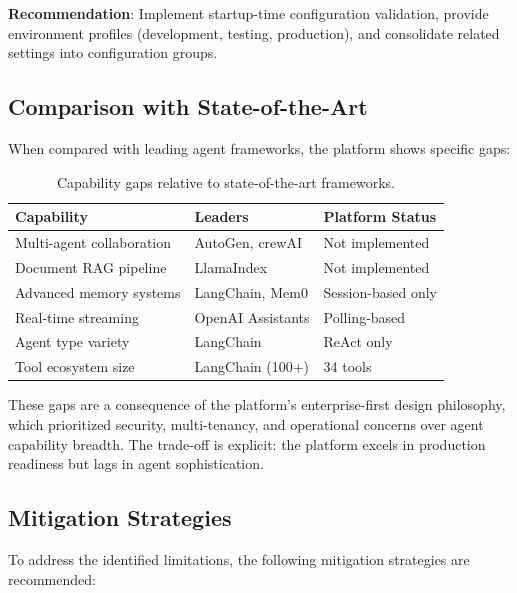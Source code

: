 \textbf{Recommendation}: Implement startup-time configuration validation, provide environment profiles (development, testing, production), and consolidate related settings into configuration groups.

\subsection{Comparison with State-of-the-Art}

When compared with leading agent frameworks, the platform shows specific gaps:

\begin{table}[ht]
\centering
\caption{Capability gaps relative to state-of-the-art frameworks.}
\label{tab:sota-gaps}
\small
\begin{tabular}{p{4cm}p{3cm}p{5cm}}
\hline
\textbf{Capability} & \textbf{Leaders} & \textbf{Platform Status} \\
\hline
Multi-agent collaboration & AutoGen, crewAI & Not implemented \\
Document RAG pipeline & LlamaIndex & Not implemented \\
Advanced memory systems & LangChain, Mem0 & Session-based only \\
Real-time streaming & OpenAI Assistants & Polling-based \\
Agent type variety & LangChain & ReAct only \\
Tool ecosystem size & LangChain (100+) & 34 tools \\
\hline
\end{tabular}
\end{table}

These gaps are a consequence of the platform's enterprise-first design philosophy, which prioritized security, multi-tenancy, and operational concerns over agent capability breadth. The trade-off is explicit: the platform excels in production readiness but lags in agent sophistication.

\subsection{Mitigation Strategies}

To address the identified limitations, the following mitigation strategies are recommended:

